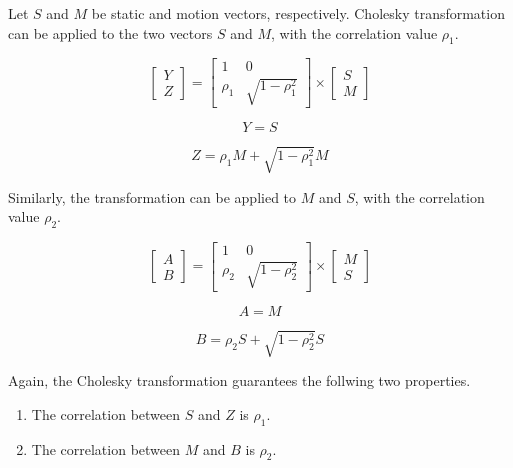 Let $S$ and $M$ be static and motion vectors, respectively. Cholesky transformation can be applied to the two vectors $S$ and $M$, 
with the correlation value $\rho_{1}$.

\begin{equation}
\begin{bmatrix}
    Y     \\
    Z     
\end{bmatrix}
=
\begin{bmatrix}
    1  & 0 \\
    \rho_{1}  & \sqrt{1-\rho_{1}^2}    
\end{bmatrix}
\times
\begin{bmatrix}
    S    \\
    M     
\end{bmatrix}
\end{equation}

\begin{equation}
Y = S
\end{equation}

\begin{equation}
Z = \rho_{1} M + \sqrt{1-\rho_{1}^2}M
\end{equation}

Similarly, the transformation can be applied to $M$ and $S$, with the correlation value $\rho_{2}$.


\begin{equation}
\begin{bmatrix}
    A     \\
    B     
\end{bmatrix}
=
\begin{bmatrix}
    1  & 0 \\
    \rho_{2}  & \sqrt{1-\rho_{2}^2}    
\end{bmatrix}
\times
\begin{bmatrix}
    M    \\
    S     
\end{bmatrix}
\end{equation}

\begin{equation}
A = M
\end{equation}

\begin{equation}
B = \rho_{2} S + \sqrt{1-\rho_{2}^2}S
\end{equation}

Again, the Cholesky transformation guarantees the follwing two properties.


\begin{enumerate}
  \item The correlation between $S$ and $Z$ is $\rho_{1}$.
  \item The correlation between $M$ and $B$ is $\rho_{2}$.
\end{enumerate}

